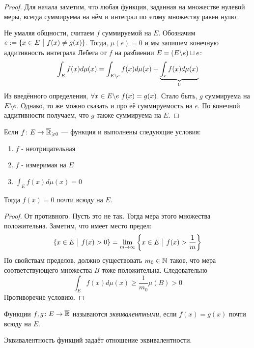 \begin{proof}
	Для начала заметим, что любая функция, заданная на множестве нулевой меры, всегда суммируема на нём и интеграл по этому множеству равен нулю.
	
	Не умаляя общности, считаем $f$ суммируемой на $E$. Обозначим $e := \{x \in E \ \big|\  f(x) \neq g(x)\}$. Тогда, $\mu(e) = 0$ и мы запишем конечную аддитивность интеграла Лебега от $f$ на разбиении $E = (E \backslash e) \sqcup e$:
	\[
		\int_E f(x)d\mu(x) = \int_{E \backslash e} f(x)d\mu(x) + \underbrace{\int_e f(x)d\mu(x)}_{0}
	\]
	Из введённого определения, $\forall x \in E \backslash e\ f(x) = g(x)$. Стало быть, $g$ суммируема на $E \backslash e$. Однако, то же можно сказать и про её суммируемость на $e$. По конечной аддитивности получаем, что $g$ также суммируема на $E$.
\end{proof}

\begin{corollary}
	Если $f \colon E \to \overline{\mathbb{R}}_{\geqslant 0}$ --- функция и выполнены следующие условия:
	\begin{enumerate}
		\item $f$ - неотрицательная
		
		\item $f$ - измеримая на $E$
		
		\item $\int_E f(x)d\mu(x) = 0$
	\end{enumerate}
	Тогда $f(x) = 0$ почти всюду на $E$.
\end{corollary}

\begin{proof}
	От противного. Пусть это не так. Тогда мера этого множества положительна. Заметим, что имеет место предел:
	\[
		\{x \in E \ \big|\  f(x) > 0\} = \lim_{m \to \infty} \left\{x \in E \ \big|\  f(x) > \frac{1}{m}\right\}
	\]
	По свойствам пределов, должно существовать $m_0 \in \mathbb{N}$ такое, что мера соответствующего множества $B$ тоже положительна. Следовательно
	\[
		\int_E f(x)d\mu(x) \ge \frac{1}{m_0}\mu(B) > 0
	\]
	Противоречие условию.
\end{proof}

\begin{definition}
	Функции $f, g \colon E \to \overline{\mathbb{R}}$ называются \textit{эквивалентными}, если $f(x) = g(x)$ почти всюду на $E$.
\end{definition}

\begin{proposition}
	Эквивалентность функций задаёт отношение эквивалентности.
\end{proposition}

